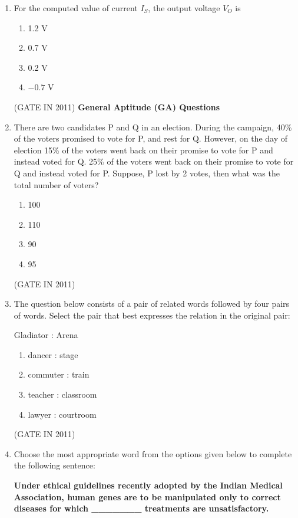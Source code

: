 \documentclass[journal]{IEEEtran}
\begin{document}
\begin{enumerate}
\item For the computed value of current $I_S$, the output voltage $V_O$ is

\begin{multicols}{4}
\begin{enumerate}
\item 1.2 V
\item 0.7 V
\item 0.2 V
\item $-0.7$ V
\end{enumerate}
\end{multicols} \hfill(GATE IN 2011)
\textbf{General Aptitude (GA) Questions}
\item There are two candidates P and Q in an election. During the campaign, 40\% of the voters promised to vote for P, and rest for Q. However, on the day of election 15\% of the voters went back on their promise to vote for P and instead voted for Q. 25\% of the voters went back on their promise to vote for Q and instead voted for P. Suppose, P lost by 2 votes, then what was the total number of voters?

\begin{multicols}{4}
\begin{enumerate}
\item 100
\item 110
\item 90
\item 95
\end{enumerate}
\end{multicols} \hfill(GATE IN 2011)

\item The question below consists of a pair of related words followed by four pairs of words. Select the pair that best expresses the relation in the original pair:

Gladiator : Arena

\begin{enumerate}
\item dancer : stage
\item commuter : train
\item teacher : classroom
\item lawyer : courtroom
\end{enumerate}
\hfill(GATE IN 2011)

\item Choose the most appropriate word from the options given below to complete the following sentence:

\textbf{Under ethical guidelines recently adopted by the Indian Medical Association, human genes are to be manipulated only to correct diseases for which \_\_\_\_\_\_\_ treatments are unsatisfactory.}



\end{enumerate}
\end{document}
